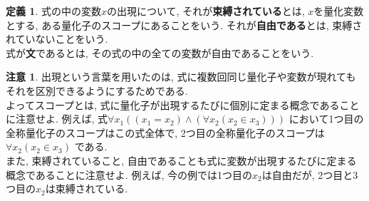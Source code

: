 \documentclass[a4paper]{bxjsarticle}
\theoremstyle{definition}
\newtheorem{defn}[thm]{定義}
\newtheorem{rem}[thm]{注意}
\begin{document}
    \begin{defn}
        式の中の変数$x$の出現について,  それが\textbf{束縛されている}とは, $x$を量化変数とする, ある量化子のスコープにあることをいう. それが\textbf{自由である}とは, 束縛されていないことをいう.\\
        式が\textbf{文}であるとは, その式の中の全ての変数が自由であることをいう.
    \end{defn}
    \begin{rem}
        出現という言葉を用いたのは, 式に複数回同じ量化子や変数が現れてもそれを区別できるようにするためである.\\
        よってスコープとは, 式に量化子が出現するたびに個別に定まる概念であることに注意せよ. 例えば, 式$\forall x_1 ((x_1=x_2) \land (\forall x_2 (x_2 \in x_3)))$ において1つ目の全称量化子のスコープはこの式全体で, 2つ目の全称量化子のスコープは$\forall x_2 (x_2 \in x_3)$ である.\\
        また, 束縛されていること, 自由であることも式に変数が出現するたびに定まる概念であることに注意せよ. 例えば, 今の例では1つ目の$x_2$は自由だが, 2つ目と3つ目の$x_2$は束縛されている.\\
    \end{rem}
\end{document}
